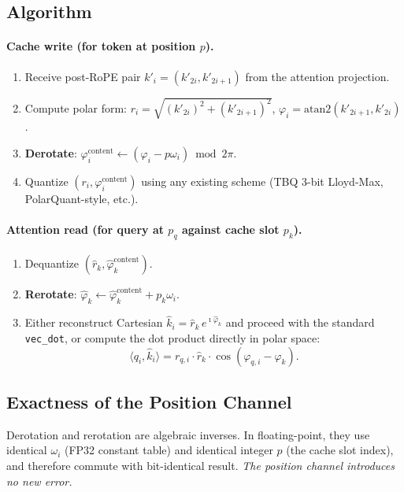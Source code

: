 \documentclass[10pt,twocolumn]{article}
\begin{document}
\subsection{Algorithm}

\paragraph{Cache write (for token at position $p$).}
\begin{enumerate}[leftmargin=*,topsep=2pt,itemsep=1pt]
\item Receive post-RoPE pair $k'_i=(k'_{2i},k'_{2i+1})$ from the attention projection.
\item Compute polar form:
$r_i=\sqrt{(k'_{2i})^2+(k'_{2i+1})^2}$,
$\varphi_i=\text{atan2}(k'_{2i+1},k'_{2i})$.
\item \textbf{Derotate}:
$\varphi^{\text{content}}_i\leftarrow(\varphi_i-p\omega_i)\bmod 2\pi$.
\item Quantize $(r_i,\varphi^{\text{content}}_i)$ using any existing scheme (TBQ 3-bit Lloyd-Max, PolarQuant-style, etc.).
\end{enumerate}

\paragraph{Attention read (for query at $p_q$ against cache slot $p_k$).}
\begin{enumerate}[leftmargin=*,topsep=2pt,itemsep=1pt]
\item Dequantize $(\hat{r}_k,\hat{\varphi}^{\text{content}}_k)$.
\item \textbf{Rerotate}:
$\hat{\varphi}_k\leftarrow\hat{\varphi}^{\text{content}}_k+p_k\omega_i$.
\item Either reconstruct Cartesian
$\hat{k}_i=\hat{r}_k\,e^{\imath\hat{\varphi}_k}$
and proceed with the standard \texttt{vec\_dot},
or compute the dot product directly in polar space:
\begin{equation}
\langle q_i,\hat{k}_i\rangle
=r_{q,i}\cdot\hat{r}_k\cdot\cos(\varphi_{q,i}-\hat{\varphi}_k).
\label{eq:polar-dot}
\end{equation}
\end{enumerate}

\subsection{Exactness of the Position Channel}
\label{sec:exact}

Derotation and rerotation are algebraic inverses. In floating-point, they use identical $\omega_i$ (FP32 constant table) and identical integer $p$ (the cache slot index), and therefore commute with bit-identical result. \emph{The position channel introduces no new error.}
\end{document}
